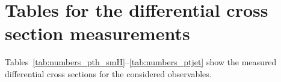 \section{Tables for the differential cross section measurements}
\label{app:tables}

Tables~\ref{tab:numbers_pth_smH}--\ref{tab:numbers_ptjet} show the measured differential cross sections for the considered observables.

\begin{table}[h!]
    \centering
    \label{tab:numbers_pth_smH}
    \end{table}

\begin{table}[h!]
    \centering
    \label{tab:numbers_pth_ggH}
    \end{table}


\begin{table}[h!]
    \centering
    \label{tab:numbers_njets}
    \begin{tabular}{|l|c|c|c|c|c|}
    \hline
     \\
    \hline
    \end{tabular}
    \end{table}

\begin{table}[h!]
    \centering
    \label{tab:numbers_absy}
    \begin{tabular}{|l|c|c|c|c|c|c|}
    \hline
     \\
    \hline
    \end{tabular}
    \end{table}

